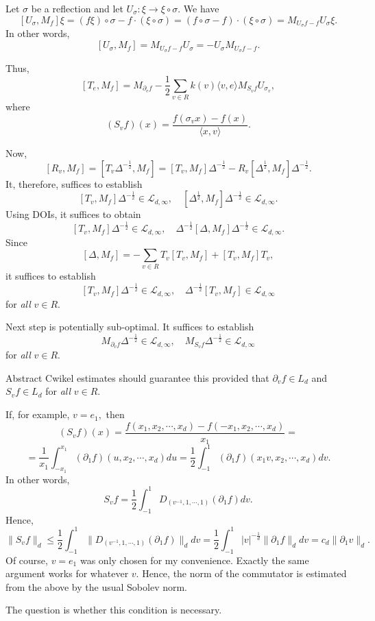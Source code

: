 \documentclass{amsart}
\begin{document}
Let $\sigma$ be a reflection and let $U_{\sigma}:\xi\to \xi\circ\sigma.$ We have
$$[U_{\sigma},M_f]\xi=(f\xi)\circ\sigma-f\cdot (\xi\circ\sigma)=(f\circ\sigma-f)\cdot (\xi\circ\sigma)=M_{U_{\sigma}f-f}U_{\sigma}\xi.$$
In other words,
$$[U_{\sigma},M_f]=M_{U_{\sigma}f-f}U_{\sigma}=-U_{\sigma}M_{U_{\sigma}f-f}.$$

Thus,
$$[T_e,M_f]=M_{\partial_ef}-\frac12\sum_{v\in R}k(v)\langle v,e\rangle M_{S_vf}U_{\sigma_v},$$
where
$$(S_vf)(x)=\frac{f(\sigma_vx)-f(x)}{\langle x,v\rangle}.$$

Now,
$$[R_v,M_f]=[T_v\Delta^{-\frac12},M_f]=[T_v,M_f]\Delta^{-\frac12}-R_v[\Delta^{\frac12},M_f]\Delta^{-\frac12}.$$
It, therefore, suffices to establish
$$[T_v,M_f]\Delta^{-\frac12}\in\mathcal{L}_{d,\infty},\quad [\Delta^{\frac12},M_f]\Delta^{-\frac12}\in\mathcal{L}_{d,\infty}.$$
Using DOIs, it suffices to obtain 
$$[T_v,M_f]\Delta^{-\frac12}\in\mathcal{L}_{d,\infty},\quad \Delta^{-\frac12}[\Delta,M_f]\Delta^{-\frac12}\in\mathcal{L}_{d,\infty}.$$
Since
$$[\Delta,M_f]=-\sum_{v\in R}T_v[T_v,M_f]+[T_v,M_f]T_v,$$
it suffices to establish
$$[T_v,M_f]\Delta^{-\frac12}\in\mathcal{L}_{d,\infty},\quad \Delta^{-\frac12}[T_v,M_f]\in\mathcal{L}_{d,\infty}$$
for {\it all} $v\in R.$

Next step is potentially sub-optimal. It suffices to establish
$$M_{\partial_vf}\Delta^{-\frac12}\in\mathcal{L}_{d,\infty},\quad M_{S_vf}\Delta^{-\frac12}\in\mathcal{L}_{d,\infty}$$
for {\it all} $v\in R.$ 

Abstract Cwikel estimates should guarantee this provided that $\partial_vf\in L_d$ and $S_vf\in L_d$
for {\it all} $v\in R.$

If, for example, $v=e_1,$ then
$$(S_vf)(x)=\frac{f(x_1,x_2,\cdots,x_d)-f(-x_1,x_2,\cdots,x_d)}{x_1}=$$
$$=\frac1{x_1}\int_{-x_1}^{x_1}(\partial_1f)(u,x_2,\cdots,x_d)du=\frac12\int_{-1}^1(\partial_1f)(x_1v,x_2,\cdots,x_d)dv.$$
In other words,
$$S_vf=\frac12\int_{-1}^1D_{(v^{-1},1,\cdots,1)}(\partial_1f)dv.$$
Hence,
$$\|S_vf\|_d\leq \frac12\int_{-1}^1\|D_{(v^{-1},1,\cdots,1)}(\partial_1f)\|_d dv=\frac12\int_{-1}^1|v|^{-\frac1d}\|\partial_1f\|_ddv=c_d\|\partial_1v\|_d.$$
Of course, $v=e_1$ was only chosen for my convenience. Exactly the same argument works for whatever $v.$ Hence, the norm of the commutator is estimated from the above by the usual Sobolev norm. 

The question is whether this condition is necessary.
\end{document}
